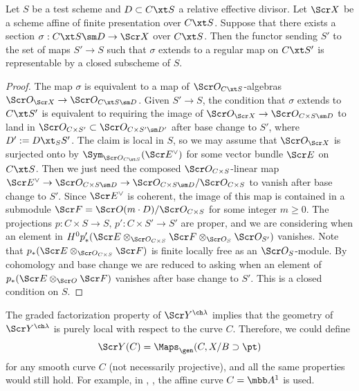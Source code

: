 \begin{lem}
\notready \label{lem:extendsection}
Let $S$ be a test scheme and $D \subset C\xt S$ a relative effective divisor.
Let $\Scr X$ be a scheme affine of finite presentation over $C\xt S$.
Suppose that there exists a section
$\sigma : C\xt S \sm D \to \Scr X$ over $C\xt S$.
Then the functor sending $S'$ to the set of
maps $S'\to S$ such that $\sigma$ extends to a regular map on $C\xt S'$
is representable by a closed subscheme of $S$.
\end{lem}
\begin{proof} The map $\sigma$ is equivalent to a map of
$\Scr O_{C\xt S}$-algebras
$\Scr O_{\Scr X} \to \Scr O_{C\xt S\sm D}$.
Given $S' \to S$, the condition that
$\sigma$ extends to $C\xt S'$ is equivalent to
requiring the image of
$\Scr O_{\Scr X} \to \Scr O_{C\times S\sm D}$ to land in $\Scr O_{C\times S'} \subset \Scr O_{C\times S' \sm D'}$
after base change to $S'$, where $D':= D\xt_S S'$.
The claim is local in $S$, so we may assume that
$\Scr O_{\Scr X}$ is surjected onto by
$\Sym_{\Scr O_{C\xt S}}(\Scr E^\vee)$ for some
vector bundle $\Scr E$ on $C\xt S$.
Then we just need the composed $\Scr O_{C\times S}$-linear map $\Scr E^\vee \to \Scr O_{C\times S \sm D} \to \Scr O_{C\times S\sm D}/\Scr O_{C\times S}$ to vanish after base change to $S'$.
Since $\Scr E^\vee$ is coherent, the image of this map
is contained in a submodule $\Scr F = \Scr O(m\cdot D)/\Scr O_{C\times S}$
for some integer $m \ge 0$.
The projections $p: C\times S \to S,\, p':C\times S'\to S'$ are proper, and we are considering
when an element in $H^0 p'_*( \Scr E \otimes_{\Scr O_{C\times S}} \Scr F \otimes_{\Scr O_S} \Scr O_{S'})$ vanishes.
Note that $p_*(\Scr E \otimes_{\Scr O_{C\times S}} \Scr F)$ is finite locally free
as an $\Scr O_S$-module.
By cohomology and base change
we are reduced to asking when an element of $p_*(\Scr E \otimes_{\Scr O} \Scr F)$
vanishes after base change to $S'$.
This is a closed condition on $S$.
\end{proof}

\begin{rem}
\notready \label{rem:opencurve}
The graded factorization property of $\Scr Y^{\ch\lambda}$ implies that
the geometry of $\Scr Y^{\ch\lambda}$ is purely local
with respect to the curve $C$. Therefore, we could define
\[ \Scr Y(C) = \Maps_\gen(C, X/B \supset \pt) \]
for any smooth curve $C$ (not necessarily projective), and all
the same properties would still hold.
For example, in \cite{FM}, \cite{Drinfeld}, the affine curve $C = \mbb A^1$ is used.
\end{rem}

